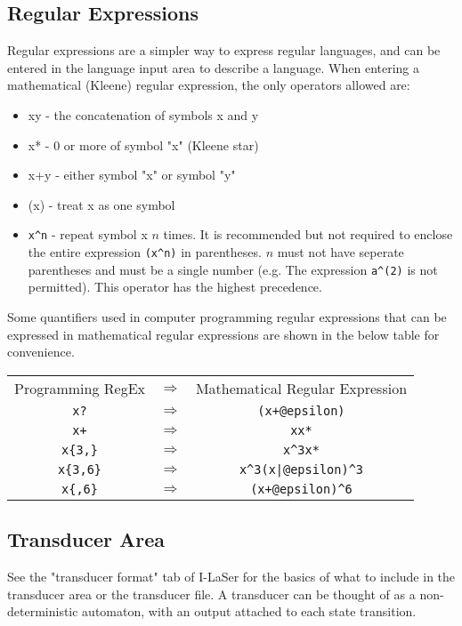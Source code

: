 \documentclass{article}
\begin{document}
\subsection{Regular Expressions}
Regular expressions are a simpler way to express regular languages, and can be entered in the language input area to describe a language.
When entering a mathematical (Kleene) regular expression, the only operators allowed are:
\begin{itemize}
\item xy - the concatenation of symbols x and y
\item x* - 0 or more of symbol "x" (Kleene star)
\item x+y - either symbol "x" or symbol "y"
\item (x) - treat x as one symbol
\item \verb-x^n- - repeat symbol x $n$ times. It is recommended but not required to enclose the entire expression \verb-(x^n)- in parentheses. $n$ must not have seperate parentheses and must be a single number (e.g. The expression \verb-a^(2)- is not permitted). This operator has the highest precedence.
\end{itemize}


\par Some quantifiers used in computer programming regular expressions that can be expressed in mathematical regular expressions are shown in the below table for convenience.
\begin{center}
\begin{tabular}{c c c}
Programming RegEx & $\Rightarrow$ & Mathematical Regular Expression \\
\verb-x?- & $\Rightarrow$ & \verb-(x+@epsilon)-\\
\verb-x+- & $\Rightarrow$ & \verb-xx*- \\
\verb-x{3,}- & $\Rightarrow$ & \verb-x^3x*- \\
\verb-x{3,6}- & $\Rightarrow$ & \verb-x^3(x|@epsilon)^3- \\
\verb-x{,6}- & $\Rightarrow$ & \verb-(x+@epsilon)^6- \\
\end{tabular}
\end{center}



\subsection{Transducer Area}
See the "transducer format" tab of I-LaSer for the basics of what to include in the transducer area or the transducer file.
A transducer can be thought of as a non-deterministic automaton, with an output attached to each state transition.
\end{document}
